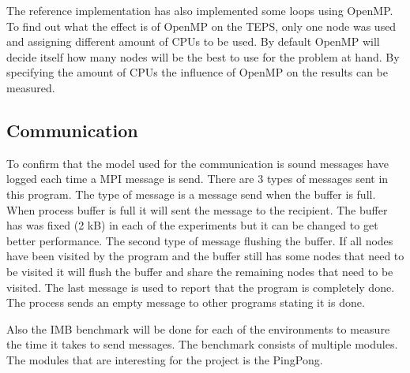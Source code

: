 The reference  implementation has also implemented some loops using OpenMP. To find out what the effect is of OpenMP on the TEPS, only one node was used and assigning different amount of CPUs to be used. By default OpenMP will decide itself how many nodes will be the best to use for the problem at hand. By specifying the amount of CPUs the influence of OpenMP on the results can be measured.    

    
\subsection{Communication}
\label{med:comm}
To confirm that the model used for the communication is sound messages have logged each time a MPI message is send. There are 3 types of messages sent in this program. The type of message is a message send when the buffer is full. When process buffer is full it will sent the message to the recipient. The buffer has was fixed (2 kB) in each of the experiments but it can be changed to get better performance. The second type of message flushing the buffer. If all nodes have been visited by the program and the buffer still has some nodes that need to be visited it will flush the buffer and share the remaining nodes that need to be visited. The last message is used to report that the program is completely done. The process sends an empty message to other programs stating it is done.

Also the IMB benchmark will be done for each of the environments to measure the time it takes to send messages. The benchmark consists of multiple modules. The modules that are interesting for the project is the PingPong. 

